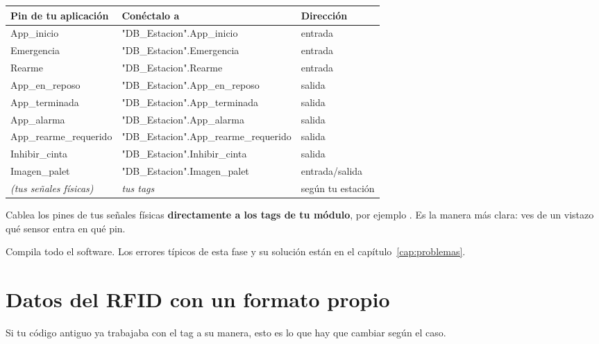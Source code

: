 \begin{center}
\footnotesize
\begin{tabularx}{\textwidth}{>{\ttfamily}p{3.5cm}>{\ttfamily}p{5.3cm}X}
\toprule
\textnormal{\textbf{Pin de tu aplicación}} & \textnormal{\textbf{Conéctalo a}} & \textbf{Dirección} \\
\midrule
App\_inicio & "DB\_Estacion".App\_inicio & entrada \\
Emergencia & "DB\_Estacion".Emergencia & entrada \\
Rearme & "DB\_Estacion".Rearme & entrada \\
App\_en\_reposo & "DB\_Estacion".App\_en\_reposo & salida \\
App\_terminada & "DB\_Estacion".App\_terminada & salida \\
App\_alarma & "DB\_Estacion".App\_alarma & salida \\
App\_rearme\_requerido & "DB\_Estacion".App\_rearme\_requerido & salida \\
Inhibir\_cinta & "DB\_Estacion".Inhibir\_cinta & salida \\
Imagen\_palet & "DB\_Estacion".Imagen\_palet & entrada/salida \\
\textit{(tus señales físicas)} & \textit{tus tags} & según tu estación \\
\bottomrule
\end{tabularx}
\end{center}

\begin{consejo}
Cablea los pines de tus señales físicas \textbf{directamente a los tags de tu módulo}, por ejemplo . Es la manera más clara: ves de un vistazo qué sensor entra en qué pin.
\end{consejo}

Compila todo el software. Los errores típicos de esta fase y su solución están en el capítulo~\ref{cap:problemas}.


\section{Datos del RFID con un formato propio}\label{sec:rfid-propio}
Si tu código antiguo ya trabajaba con el tag a su manera, esto es lo que hay que cambiar según el caso.

